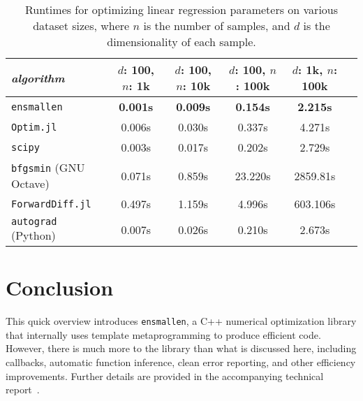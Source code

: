 \documentclass[twoside,11pt]{article}
\begin{document}
\begin{table}[b!]
{\small
\centering
\begin{tabular}{lccccc}
\toprule
{\em algorithm} & $d$: 100, $n$: 1k & $d$: 100, $n$: 10k & $d$: 100, $n$:
100k & $d$: 1k, $n$: 100k \\
\midrule
\texttt{ensmallen} & {\bf 0.001s} & {\bf 0.009s} & {\bf 0.154s} & {\bf 2.215s} \\
\texttt{Optim.jl} & 0.006s & 0.030s & 0.337s & 4.271s \\
\texttt{scipy} & 0.003s & 0.017s & 0.202s & 2.729s \\
\texttt{bfgsmin} (GNU Octave) & 0.071s & 0.859s & 23.220s & 2859.81s\\
\texttt{ForwardDiff.jl} & 0.497s & 1.159s & 4.996s & 603.106s \\
\texttt{autograd} (Python) & 0.007s & 0.026s & 0.210s & 2.673s \\
\bottomrule
\end{tabular}
\vspace*{-0.4em}
\caption{
Runtimes for optimizing linear regression parameters on various dataset sizes,
where $n$ is the number of samples,
and $d$ is the dimensionality of each sample.
}
\label{tab:lbfgs}
}
\vspace*{-2.2em}
\end{table}


\section{Conclusion}
\label{sec:conclusion}

This quick overview introduces {\tt ensmallen}, a C++ numerical optimization
library that internally uses template metaprogramming to produce efficient code.
However, there is much more to the library than what is discussed here,
including callbacks, automatic function inference, clean error reporting, and
other efficiency improvements.
Further details are provided in the accompanying technical report~\citep{ensmallen2020}.
\end{document}
